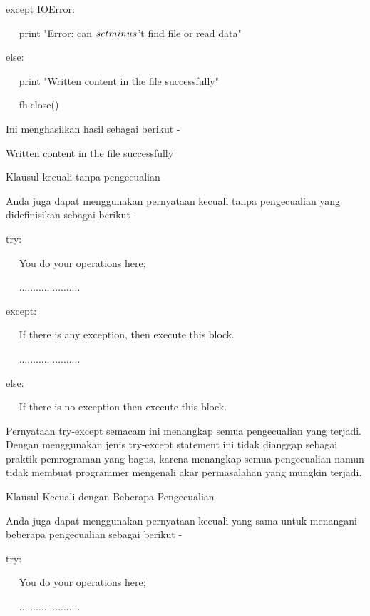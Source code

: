 except IOError: \par
~~ print "Error: can $  \\setminus  $'t find file or read data" \par
else: \par
~~ print "Written content in the file successfully" \par
~~ fh.close() \par
\vspace{12pt}
Ini menghasilkan hasil sebagai berikut - \par
\vspace{12pt}
Written content in the file successfully \par
\vspace{12pt}
Klausul kecuali tanpa pengecualian \par
\vspace{12pt}
Anda juga dapat menggunakan pernyataan kecuali tanpa pengecualian yang didefinisikan sebagai berikut - \par
\vspace{12pt}
try: \par
~~ You do your operations here; \par
~~ ...................... \par
except: \par
~~ If there is any exception, then execute this block. \par
~~ ...................... \par
else: \par
~~ If there is no exception then execute this block.  \par
\vspace{12pt}
\vspace{12pt}
Pernyataan try-except semacam ini menangkap semua pengecualian yang terjadi. Dengan menggunakan jenis try-except statement ini tidak dianggap sebagai praktik pemrograman yang bagus, karena menangkap semua pengecualian namun tidak membuat programmer mengenali akar permasalahan yang mungkin terjadi. \par
Klausul Kecuali dengan Beberapa Pengecualian \par
\vspace{12pt}
Anda juga dapat menggunakan pernyataan kecuali yang sama untuk menangani beberapa pengecualian sebagai berikut - \par
\vspace{12pt}
try: \par
~~ You do your operations here; \par
~~ ...................... \par
